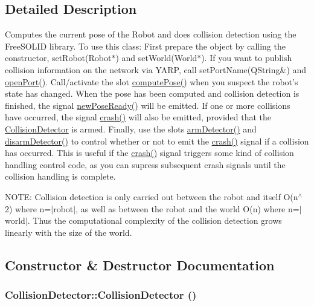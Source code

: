 \subsection{Detailed Description}
Computes the current pose of the Robot and does collision detection using the FreeSOLID library. To use this class: First prepare the object by calling the constructor, setRobot(Robot$\ast$) and setWorld(World$\ast$). If you want to publish collision information on the network via YARP, call setPortName(QString\&) and \hyperlink{class_collision_detector_a1fa9e503fff5d46bd3b068dc8cd98fe4}{openPort()}. Call/activate the slot \hyperlink{class_collision_detector_a92faad68f69ade7020a58f105f7d3aa8}{computePose()} when you suspect the robot's state has changed. When the pose has been computed and collision detection is finished, the signal \hyperlink{class_collision_detector_a9540d0ce34c4721abb8bf9bfcb1f67dd}{newPoseReady()} will be emitted. If one or more collisions have occurred, the signal \hyperlink{class_collision_detector_a7a6c1a9b11907db7252b6544ee1ce8b4}{crash()} will also be emitted, provided that the \hyperlink{class_collision_detector}{CollisionDetector} is armed. Finally, use the slots \hyperlink{class_collision_detector_ad75885bcd649c22da007c91e91b17dfc}{armDetector()} and \hyperlink{class_collision_detector_a0ff5daf20c76c64a2e284f93bd5e50a3}{disarmDetector()} to control whether or not to emit the \hyperlink{class_collision_detector_a7a6c1a9b11907db7252b6544ee1ce8b4}{crash()} signal if a collision has occurred. This is useful if the \hyperlink{class_collision_detector_a7a6c1a9b11907db7252b6544ee1ce8b4}{crash()} signal triggers some kind of collision handling control code, as you can supress subsequent crash signals until the collision handling is complete.

NOTE: Collision detection is only carried out between the robot and itself O(n$^\wedge$2) where n=$|$robot$|$, as well as between the robot and the world O(n) where n=$|$world$|$. Thus the computational complexity of the collision detection grows linearly with the size of the world. 

\subsection{Constructor \& Destructor Documentation}
\hypertarget{class_collision_detector_ab3f66bd8d272a21674e38bf46d4d31e0}{
\subsubsection[{CollisionDetector}]{\setlength{\rightskip}{0pt plus 5cm}CollisionDetector::CollisionDetector ()}}
\label{class_collision_detector_ab3f66bd8d272a21674e38bf46d4d31e0}


